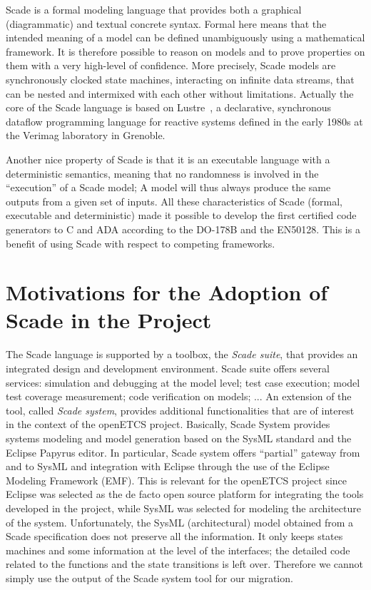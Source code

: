 \documentclass{template/openetcs_report}
\begin{document}
Scade is a formal modeling language that provides both a graphical
(diagrammatic) and textual concrete syntax. Formal here means that the
intended meaning of a model can be defined unambiguously using a
mathematical framework. It is therefore possible to reason on models
and to prove properties on them with a very high-level of
confidence. More precisely, Scade models are synchronously clocked
state machines, interacting on infinite data streams, that can be
nested and intermixed with each other without limitations. Actually
the core of the Scade language is based on
Lustre~\cite{al91,halbwachs05}, a declarative, synchronous dataflow
programming language for reactive systems defined in the early 1980s
at the Verimag laboratory in Grenoble.

Another nice property of Scade is that it is an executable language
with a deterministic semantics, meaning that no randomness is involved
in the ``execution'' of a Scade model; A model will thus always
produce the same outputs from a given set of inputs.  All these
characteristics of Scade (formal, executable and deterministic) made
it possible to develop the first certified code generators to C and
ADA according to the DO-178B and the EN50128. This is a benefit of
using Scade with respect to competing frameworks.


\section{Motivations for the Adoption of Scade in the Project}

The Scade language is supported by a toolbox, the \emph{Scade suite},
that provides an integrated design and development environment. Scade
suite offers several services: simulation and debugging at the model
level; test case execution; model test coverage measurement; code
verification on models; ... An extension of the tool, called
\emph{Scade system}, provides additional functionalities that are of
interest in the context of the openETCS project. Basically, Scade
System provides systems modeling and model generation based on the
SysML standard and the Eclipse Papyrus editor. In particular, Scade
system offers ``partial'' gateway from and to SysML and integration
with Eclipse through the use of the Eclipse Modeling Framework
(EMF). This is relevant for the openETCS project since Eclipse was
selected as the de facto open source platform for integrating the
tools developed in the project, while SysML was selected for modeling
the architecture of the system. Unfortunately, the SysML
(architectural) model obtained from a Scade specification does not
preserve all the information. It only keeps states machines and some
information at the level of the interfaces; the detailed code related
to the functions and the state transitions is left over. Therefore we
cannot simply use the output of the Scade system tool for our
migration.
\end{document}
